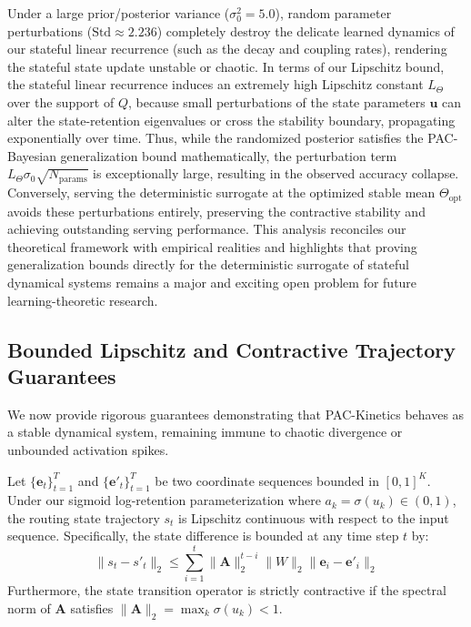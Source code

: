 Under a large prior/posterior variance ($\sigma_0^2 = 5.0$), random parameter perturbations ($\text{Std} \approx 2.236$) completely destroy the delicate learned dynamics of our stateful linear recurrence (such as the decay and coupling rates), rendering the stateful state update unstable or chaotic. In terms of our Lipschitz bound, the stateful linear recurrence induces an extremely high Lipschitz constant $L_{\Theta}$ over the support of $Q$, because small perturbations of the state parameters $\mathbf{u}$ can alter the state-retention eigenvalues or cross the stability boundary, propagating exponentially over time. Thus, while the randomized posterior satisfies the PAC-Bayesian generalization bound mathematically, the perturbation term $L_{\Theta} \sigma_0 \sqrt{N_{\text{params}}}$ is exceptionally large, resulting in the observed accuracy collapse. Conversely, serving the deterministic surrogate at the optimized stable mean $\Theta_{\text{opt}}$ avoids these perturbations entirely, preserving the contractive stability and achieving outstanding serving performance. This analysis reconciles our theoretical framework with empirical realities and highlights that proving generalization bounds directly for the deterministic surrogate of stateful dynamical systems remains a major and exciting open problem for future learning-theoretic research.

\subsection{Bounded Lipschitz and Contractive Trajectory Guarantees}
\label{sec:stability}

We now provide rigorous guarantees demonstrating that PAC-Kinetics behaves as a stable dynamical system, remaining immune to chaotic divergence or unbounded activation spikes.

\begin{lemma}
\label{lem:lipschitz}
Let $\{\mathbf{e}_t\}_{t=1}^T$ and $\{\mathbf{e}'_t\}_{t=1}^T$ be two coordinate sequences bounded in $[0, 1]^K$. Under our sigmoid log-retention parameterization where $a_k = \sigma(u_k) \in (0, 1)$, the routing state trajectory $s_t$ is Lipschitz continuous with respect to the input sequence. Specifically, the state difference is bounded at any time step $t$ by:
\begin{equation}
    \|s_t - s'_t\|_2 \le \sum_{i=1}^t \|\mathbf{A}\|_2^{t-i} \|W\|_2 \|\mathbf{e}_i - \mathbf{e}'_i\|_2
\end{equation}
Furthermore, the state transition operator is strictly contractive if the spectral norm of $\mathbf{A}$ satisfies $\|\mathbf{A}\|_2 = \max_k \sigma(u_k) < 1$.
\end{lemma}

